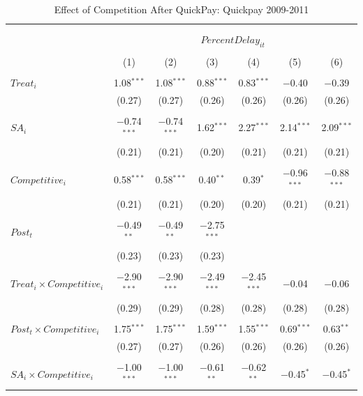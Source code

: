\documentclass[
]{article}
\begin{document}
\begin{table}[H] \centering 
  \caption{Effect of Competition After QuickPay: Quickpay 2009-2011} 
  \label{} 
\small 
\begin{tabular}{@{\extracolsep{-3pt}}lcccccc} 
\\[-1.8ex]\hline 
\hline \\[-1.8ex] 
\\[-1.8ex] & \multicolumn{6}{c}{$PercentDelay_{it}$  } \\ 
\\[-1.8ex] & (1) & (2) & (3) & (4) & (5) & (6)\\ 
\hline \\[-1.8ex] 
 $Treat_i$ & 1.08$^{***}$ & 1.08$^{***}$ & 0.88$^{***}$ & 0.83$^{***}$ & $-$0.40 & $-$0.39 \\ 
  & (0.27) & (0.27) & (0.26) & (0.26) & (0.26) & (0.26) \\ 
  & & & & & & \\ 
 $SA_i$ & $-$0.74$^{***}$ & $-$0.74$^{***}$ & 1.62$^{***}$ & 2.27$^{***}$ & 2.14$^{***}$ & 2.09$^{***}$ \\ 
  & (0.21) & (0.21) & (0.20) & (0.21) & (0.21) & (0.21) \\ 
  & & & & & & \\ 
 $Competitive_i$ & 0.58$^{***}$ & 0.58$^{***}$ & 0.40$^{**}$ & 0.39$^{*}$ & $-$0.96$^{***}$ & $-$0.88$^{***}$ \\ 
  & (0.21) & (0.21) & (0.20) & (0.20) & (0.21) & (0.21) \\ 
  & & & & & & \\ 
 $Post_t$ & $-$0.49$^{**}$ & $-$0.49$^{**}$ & $-$2.75$^{***}$ &  &  &  \\ 
  & (0.23) & (0.23) & (0.23) &  &  &  \\ 
  & & & & & & \\ 
 $Treat_i \times Competitive_i$ & $-$2.90$^{***}$ & $-$2.90$^{***}$ & $-$2.49$^{***}$ & $-$2.45$^{***}$ & $-$0.04 & $-$0.06 \\ 
  & (0.29) & (0.29) & (0.28) & (0.28) & (0.28) & (0.28) \\ 
  & & & & & & \\ 
 $Post_t \times Competitive_i$ & 1.75$^{***}$ & 1.75$^{***}$ & 1.59$^{***}$ & 1.55$^{***}$ & 0.69$^{***}$ & 0.63$^{**}$ \\ 
  & (0.27) & (0.27) & (0.26) & (0.26) & (0.26) & (0.26) \\ 
  & & & & & & \\ 
 $SA_i \times Competitive_i$ & $-$1.00$^{***}$ & $-$1.00$^{***}$ & $-$0.61$^{**}$ & $-$0.62$^{**}$ & $-$0.45$^{*}$ & $-$0.45$^{*}$ \\ 

\end{tabular}
\end{table}
\end{document}
